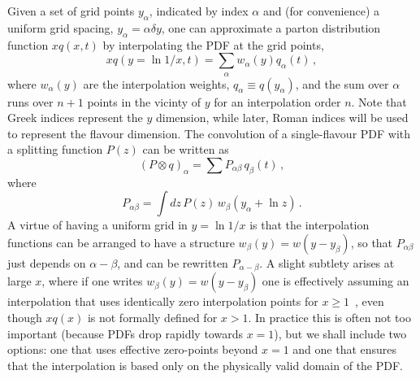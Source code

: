 \documentclass[12pt]{article}
\begin{document}
Given a set of grid points $y_\alpha$, indicated by index $\alpha$ and
(for convenience) a uniform grid spacing, $y_\alpha = \alpha \delta
y$, one can approximate a parton distribution function $xq(x,t)$ by
interpolating the PDF at the grid points,
\begin{equation}
  x q(y=\ln 1/x,t) = \sum_\alpha w_\alpha(y) q_\alpha(t)\,,
\end{equation}
where $w_\alpha(y)$ are the interpolation weights, $q_\alpha \equiv
q(y_\alpha)$, and the sum over $\alpha$ runs over $n+1$ points in the
vicinty of $y$ for an interpolation order $n$. Note that Greek
indices represent the $y$ dimension, while later, Roman indices will
be used to represent the flavour dimension.
%
The convolution of a single-flavour PDF with a splitting function
$P(z)$ can be written as
\begin{equation}
  (P \otimes q)_\alpha = \sum P_{\alpha\beta} \, q_\beta(t)\,,
\end{equation}
where 
\begin{equation}
  \label{eq:Palphabeta}
  P_{\alpha\beta} = \int dz \,P(z)\, w_\beta(y_\alpha + \ln z)\,.
\end{equation}
A virtue of having a uniform grid in $y = \ln 1/x$ is that the
interpolation functions can be arranged to have a structure
$w_\beta(y) = w(y - y_\beta)$, so that $P_{\alpha\beta}$ just depends
on $\alpha - \beta$, and can be rewritten $P_{\alpha - \beta}$. A
slight subtlety arises at large $x$, where if one writes $w_\beta(y) =
w(y - y_\beta)$ one is effectively assuming an interpolation that uses
identically zero interpolation points for $x\ge 1$~\cite{coriano},
even though $xq(x)$ is not formally defined for $x > 1$. In practice
this is often not too important (because PDFs drop rapidly towards
$x=1$), but we shall include two options: one that uses effective
zero-points beyond $x=1$ and one that ensures that the interpolation
is based only on the physically valid domain of the PDF.

\end{document}
